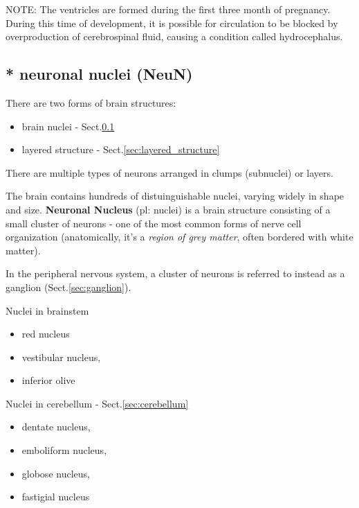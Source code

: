 NOTE: The ventricles are formed during the first three month of pregnancy.
During this time of development, it is possible for circulation to be blocked by
overproduction of cerebrospinal fluid, causing a condition called hydrocephalus.

\subsection{* neuronal nuclei (NeuN)}
\label{sec:nuclei_structure}


There are two forms of brain structures:
\begin{itemize}
  \item brain nuclei - Sect.\ref{sec:nuclei_structure}
  
  \item layered structure - Sect.\ref{sec:layered_structure}
\end{itemize}
There are multiple types of neurons arranged in clumps (subnuclei) or layers.

The brain contains hundreds of distuinguishable nuclei, varying widely in shape
and size. {\bf Neuronal Nucleus} (pl: nuclei) is a brain structure consisting of
a small cluster of neurons - one of the most common forms of nerve cell organization (anatomically,
it's a {\it region of grey matter}, often bordered with white matter). 

\begin{mdframed}

In the peripheral nervous system, a cluster of neurons is referred to instead as
a ganglion (Sect.\ref{sec:ganglion}).

\end{mdframed}

 
Nuclei in brainstem
\begin{itemize}
  \item red nucleus
  \item vestibular nucleus, 
  \item inferior olive
\end{itemize}

Nuclei in cerebellum - Sect.\ref{sec:cerebellum}
\begin{itemize}
  \item dentate nucleus, 
  \item emboliform nucleus, 
  \item globose nucleus, 
  \item fastigial nucleus
\end{itemize}

